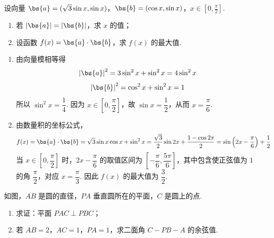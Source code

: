 \begin{problem}
设向量 \(\bs{a} = (\sqrt{3}\sin x, \sin x)\)，\(\bs{b} = (\cos x, \sin x)\)，\(x \in \left[0, \frac{\pi}{2}\right]\).

\begin{enumerate}
\item 若 \(\left|\bs{a}\right| = \left|\bs{b}\right|\)，求 \(x\) 的值；
\item 设函数 \(f(x) = \bs{a} \cdot \bs{b}\)，求 \(f(x)\) 的最大值.
\end{enumerate}
\end{problem}

\begin{solution}
\begin{enumerate}
\item 由向量模相等得
\[
\left|\bs{a}\right|^2=3\sin^2x+\sin^2x=4\sin^2x
\]
\[
\left|\bs{b}\right|^2=\cos^2x+\sin^2x=1
\]
所以 \(\sin^2x=\dfrac14\). 因为 \(x\in\left[0,\dfrac\pi2\right]\)，故 \(\sin x=\dfrac12\)，从而 \(x=\dfrac\pi6\).

\item 由数量积的坐标公式，
\[
f(x)=\bs{a}\cdot\bs{b}=\sqrt3\sin x\cos x+\sin^2x
=\frac{\sqrt3}{2}\sin2x+\frac{1-\cos2x}{2}
=\sin\left(2x-\frac\pi6\right)+\frac12
\]
当 \(x\in\left[0,\dfrac\pi2\right]\) 时，\(2x-\dfrac\pi6\) 的取值区间为 \(\left[-\dfrac\pi6,\dfrac{5\pi}6\right]\)，其中包含使正弦值为 \(1\) 的角 \(\dfrac\pi2\)，对应 \(x=\dfrac\pi3\). 因此 \(f(x)\) 的最大值为 \(\dfrac32\).
\end{enumerate}
\end{solution}

\begin{problem}
如图，\(AB\) 是圆的直径，\(PA\) 垂直圆所在的平面，\(C\) 是圆上的点.

\begin{enumerate}
\item 求证：平面 \(PAC \perp PBC\)；
\item 若 \(AB = 2\)，\(AC = 1\)，\(PA = 1\)，求二面角 \(C - PB - A\) 的余弦值.
\end{enumerate}

\end{problem}

